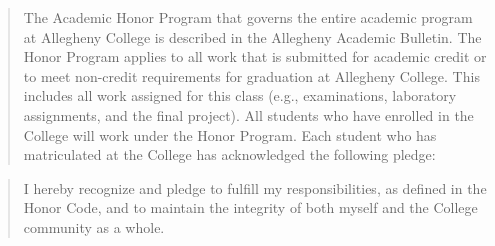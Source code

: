 \documentclass[11pt]{article}
\begin{document}
\begin{quote}

  The Academic Honor Program that governs the entire academic program at
  Allegheny College is described in the Allegheny Academic Bulletin. The Honor
  Program applies to all work that is submitted for academic credit or to meet
  non-credit requirements for graduation at Allegheny College. This includes all
  work assigned for this class (e.g., examinations, laboratory assignments, and
  the final project). All students who have enrolled in the College will work
  under the Honor Program. Each student who has matriculated at the College has
  acknowledged the following pledge:

\end{quote}

\begin{quote}

  I hereby recognize and pledge to fulfill my responsibilities, as defined in the Honor Code, and to maintain the
  integrity of both myself and the College community as a whole.

\end{quote}
\end{document}
